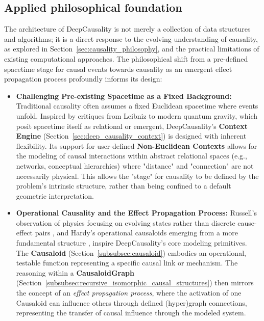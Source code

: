 \subsection{Applied philosophical foundation}
\label{subsec:philosophical_motivations_architecture}

The architecture of DeepCausality is not merely a collection of data structures and algorithms; it is a direct response to the evolving understanding of causality, as explored in Section~\ref{sec:causality_philosophy}, and the practical limitations of existing computational approaches. The philosophical shift from a pre-defined spacetime stage for causal events towards causality as an emergent effect propagation process profoundly informs its design:

\begin{itemize}
    \item \textbf{Challenging Pre-existing Spacetime as a Fixed Background:} Traditional causality often assumes a fixed Euclidean spacetime where events unfold. Inspired by critiques from Leibniz to modern quantum gravity, which posit spacetime itself as relational or emergent, DeepCausality's \textbf{Context Engine} (Section~\ref{sec:deep_causality_context}) is designed with inherent flexibility. Its support for user-defined \textbf{Non-Euclidean Contexts} allows for the modeling of causal interactions within abstract relational spaces (e.g., networks, conceptual hierarchies) where "distance" and "connection" are not necessarily physical. This allows the "stage" for causality to be defined by the problem's intrinsic structure, rather than being confined to a default geometric interpretation.

    \item \textbf{Operational Causality and the Effect Propagation Process:} Russell's observation of physics focusing on evolving states rather than discrete cause-effect pairs \cite{Russell_Cause1912}, and Hardy's operational causaloids emerging from a more fundamental structure \cite{hardy2005probability}, inspire DeepCausality's core modeling primitives. The \textbf{Causaloid} (Section~\ref{subsubsec:causaloid}) embodies an operational, testable function representing a specific causal link or mechanism. The reasoning within a \textbf{CausaloidGraph} (Section~\ref{subsubsec:recursive_isomorphic_causal_structures}) then mirrors the concept of an \textit{effect propagation process}, where the activation of one Causaloid can influence others through defined (hyper)graph connections, representing the transfer of causal influence through the modeled system.


\end{itemize}
